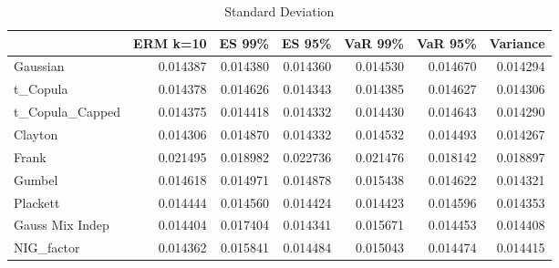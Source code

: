 \begin{table}
\begin{tabular}{lrrrrrr}
\toprule
{} &  ERM k=10 &    ES 99\% &    ES 95\% &   VaR 99\% &   VaR 95\% &  Variance \\
\midrule
Gaussian        &  0.014387 &  0.014380 &  0.014360 &  0.014530 &  0.014670 &  \color{blue}0.014294 \\
t\_Copula        &  0.014378 &  0.014626 &  0.014343 &  0.014385 &  0.014627 &  \color{blue}0.014306 \\
t\_Copula\_Capped &  0.014375 &  0.014418 &  0.014332 &  0.014430 &  0.014643 &  \color{blue}0.014290 \\
Clayton         &  0.014306 &  0.014870 &  0.014332 &  0.014532 &  0.014493 &  \color{blue}0.014267 \\
Frank           &  0.021495 &  0.018982 &  0.022736 &  0.021476 &  \color{blue}0.018142 &  0.018897 \\
Gumbel          &  0.014618 &  0.014971 &  0.014878 &  0.015438 &  0.014622 &  \color{blue}0.014321 \\
Plackett        &  0.014444 &  0.014560 &  0.014424 &  0.014423 &  0.014596 &  \color{blue}0.014353 \\
Gauss Mix Indep &  0.014404 &  0.017404 &  \color{blue}0.014341 &  0.015671 &  0.014453 &  0.014408 \\
NIG\_factor      &  \color{blue}0.014362 &  0.015841 &  0.014484 &  0.015043 &  0.014474 &  0.014415 \\
\bottomrule
\end{tabular}
\caption{Standard Deviation}
\end{table}